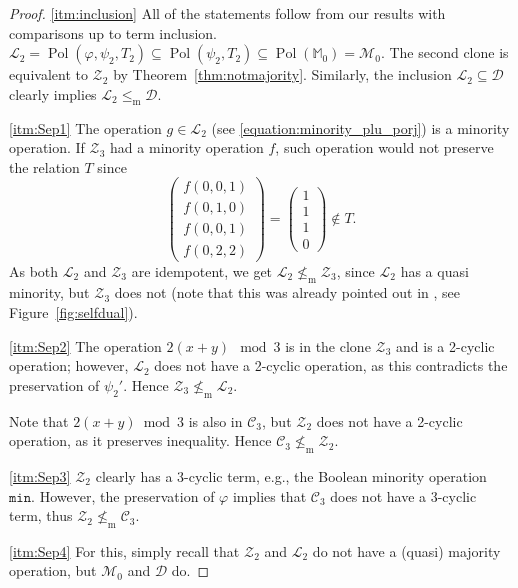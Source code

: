 \documentclass[12pt]{amsart}
\theoremstyle{definition}
\theoremstyle{definition}
\newcommand{\clo}[1]{\mathcal{#1}}
\DeclareMathOperator{\Pol}{Pol}
\newcommand{\isaminorof}{\leq_{\mathrm{m}}}
\newcommand{\notisaminorof}{\nleq_{\mathrm{m}}}
\newcommand{\minority}{\mathtt{min}}
\begin{document}
\begin{proof}
    \eqref{itm:inclusion} All of the statements follow from our results with comparisons up to term inclusion. $\clo{L}_2 = \Pol(\varphi,\psi_2,T_2) \subseteq \Pol(\psi_2,T_2) \subseteq \Pol(\mathbb M_0) = \clo{M}_0$. The second clone is equivalent to $\clo{Z}_2$ by Theorem~\ref{thm:notmajority}. Similarly, the inclusion $\clo{L}_2 \subseteq \clo{D}$ clearly implies $\clo{L}_2 \isaminorof \clo{D}$.
    
    \eqref{itm:Sep1} The operation $g\in\clo{L}_2$ (see \eqref{equation:minority_plu_porj}) is a minority operation. If $\clo{Z}_3$ had a minority operation $f$, such operation would not preserve the relation $T$ since
    \[\begin{pmatrix}
        f(0,0,1)
        \\f(0,1,0)
        \\f(0,0,1)
        \\f(0,2,2)
    \end{pmatrix}=\begin{pmatrix}
       1 \\1\\1\\0
    \end{pmatrix}\notin T.\]
    As both $\clo{L}_2$ and $\clo{Z}_3$ are idempotent, we get $\clo{L}_2\notisaminorof\clo{Z}_3$, since $\clo{L}_2$ has a quasi minority, but $\clo{Z}_3$ does not (note that this was already pointed out in \cite{BodirskyVucajZhuk}, see Figure~\ref{fig:selfdual}).
    
    \eqref{itm:Sep2} The operation $2(x+y)\mod3$ is in the clone $\clo{Z}_3$ and is a 2-cyclic operation; however, $\clo{L}_2$ does not have a 2-cyclic operation, as this contradicts the preservation of $\psi_2'$. Hence $\clo{Z}_3\notisaminorof\clo{L}_2$.

    Note that $2(x+y)\bmod3$ is also in $\clo{C}_3$, but $\clo{Z}_2$ does not have a 2-cyclic operation, as it preserves inequality. Hence $\clo{C}_3 \notisaminorof \clo{Z}_2$.

      \eqref{itm:Sep3} $\clo{Z}_2$ clearly has a 3-cyclic term, e.g., the Boolean minority operation $\minority$. However, the preservation of $\varphi$ implies that $\clo{C}_3$ does not have a 3-cyclic term, thus $\clo{Z}_2\notisaminorof\clo{C}_3$. 

    \eqref{itm:Sep4} For this, simply recall that $\clo{Z}_2$ and $\clo{L}_2$ do not have a (quasi) majority operation, but $\clo{M}_0$ and $\clo{D}$ do.
\end{proof}
\end{document}
